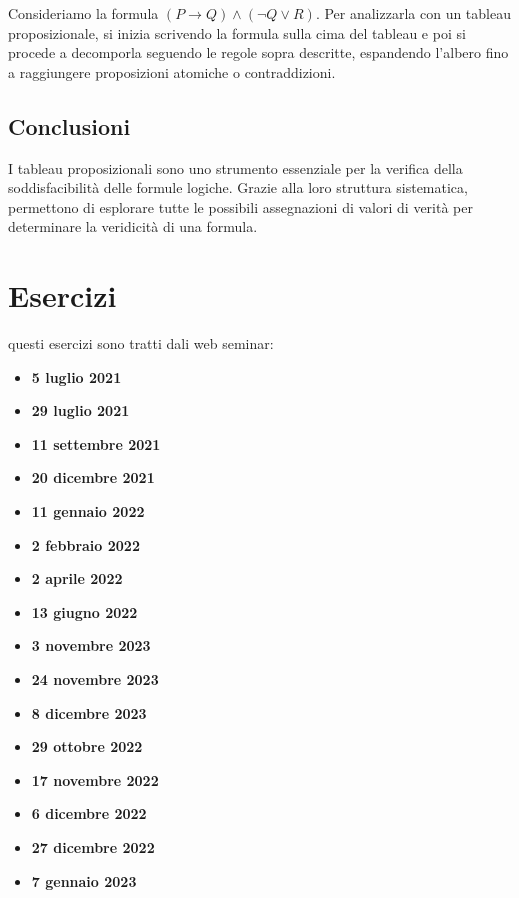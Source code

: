 \documentclass{article}
\begin{document}
Consideriamo la formula $(P \to Q) \land (\neg Q \lor R)$. Per analizzarla con un tableau proposizionale, si inizia scrivendo la formula sulla cima del tableau e poi si procede a decomporla seguendo le regole sopra descritte, espandendo l'albero fino a raggiungere proposizioni atomiche o contraddizioni.

\subsection{Conclusioni}

I tableau proposizionali sono uno strumento essenziale per la verifica della soddisfacibilità delle formule logiche. Grazie alla loro struttura sistematica, permettono di esplorare tutte le possibili assegnazioni di valori di verità per determinare la veridicità di una formula.

\newpage
\section{Esercizi}
questi esercizi sono tratti dali web seminar:
\begin{itemize}
    \item \textbf{5 luglio 2021}
    \item \textbf{29 luglio 2021}
    \item \textbf{11 settembre 2021}
    \item \textbf{20 dicembre 2021}
    \item \textbf{11 gennaio 2022}
    \item \textbf{2 febbraio 2022}
    \item \textbf{2 aprile 2022}
    \item \textbf{13 giugno 2022}
    \item \textbf{3 novembre 2023}
    \item \textbf{24 novembre 2023}
    \item \textbf{8 dicembre 2023}
    \item \textbf{29 ottobre 2022}
    \item \textbf{17 novembre 2022}    
    \item \textbf{6 dicembre 2022}
    \item \textbf{27 dicembre 2022}
    \item \textbf{7 gennaio 2023}
\end{itemize}
\end{document}
